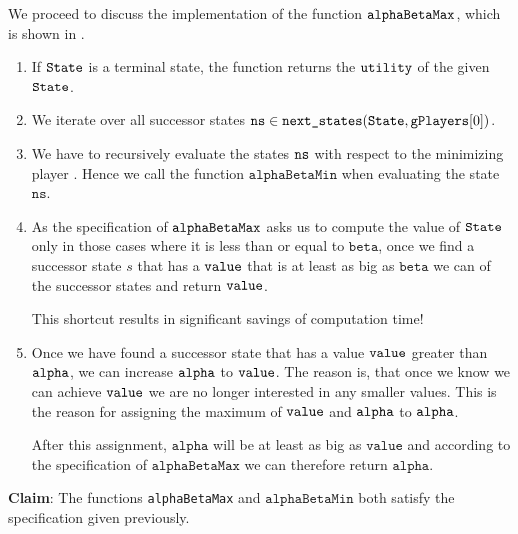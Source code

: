 \noindent
We proceed to discuss the implementation of the function $\texttt{alphaBetaMax}$, which is shown in
.
\begin{enumerate}
\item If $\texttt{State}$ is a terminal state, the function returns the $\texttt{utility}$ of the given
      $\texttt{State}$.
\item We iterate over all successor states $\texttt{ns} \in \texttt{next\_states}(\texttt{State}, \texttt{gPlayers}[0])$.
\item We have to recursively evaluate the states $\texttt{ns}$ with respect to the minimizing player
      .  Hence we call the function $\texttt{alphaBetaMin}$ when evaluating
      the state $\mathtt{ns}$.
\item As the specification of $\texttt{alphaBetaMax}$ asks us to compute the value of $\texttt{State}$ only in
      those cases where it is less than or equal to $\mathtt{beta}$, once we find a successor state $s$ that has a
      $\texttt{value}$ that is at least as big as $\mathtt{beta}$ we can  of the successor
      states and return $\texttt{value}$.

      This shortcut results in significant savings of computation time!
\item Once we have found a successor state that has a value $\texttt{value}$ greater than $\texttt{alpha}$,
      we can increase $\texttt{alpha}$ to $\texttt{value}$.  The reason is, that once we know we can
      achieve $\texttt{value}$ we are no longer interested in any smaller values.
      This is the reason for assigning the maximum of $\texttt{value}$ and $\texttt{alpha}$ to $\texttt{alpha}$.

      After this assignment, $\texttt{alpha}$ will be at least as big as $\texttt{value}$ and according to the specification
      of $\texttt{alphaBetaMax}$ we can therefore return $\texttt{alpha}$.
\end{enumerate}

\noindent
\textbf{Claim}: The functions \texttt{alphaBetaMax} and $\mathtt{alphaBetaMin}$ both satisfy the specification
given previously. 
\vspace*{0.2cm}


